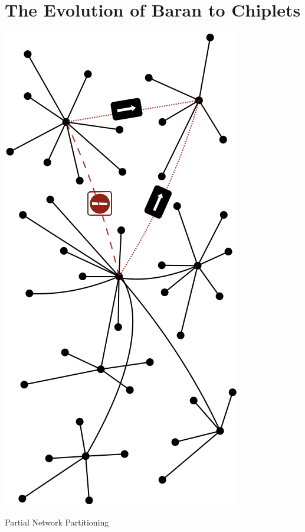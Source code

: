 \documentclass[../HFT-main.tex]{subfiles}
\begin{document}
 
\section{The Evolution of Baran to Chiplets}

\begin{marginfigure}
  \includegraphics[width=0.6\linewidth]{../figures/Baran-Decentralized-PNP.png}
  \caption{ Partial Network Partitioning}
  \vspace{20pt}
\end{marginfigure}
\end{document}
